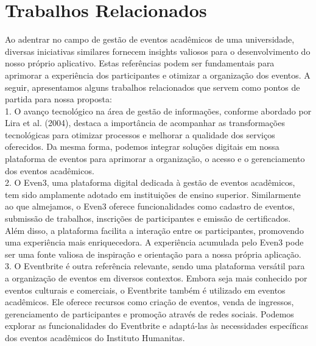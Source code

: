 \chapter{Trabalhos Relacionados}

Ao adentrar no campo de gestão de eventos acadêmicos de uma universidade, diversas iniciativas similares fornecem insights valiosos para o desenvolvimento do nosso próprio aplicativo. Estas referências podem ser fundamentais para aprimorar a experiência dos participantes e otimizar a organização dos eventos. A seguir, apresentamos alguns trabalhos relacionados que servem como pontos de partida para nossa proposta: \\

    1. O avanço tecnológico na área de gestão de informações, conforme abordado por Lira et al. (2004), destaca a importância de acompanhar as transformações tecnológicas para otimizar processos e melhorar a qualidade dos serviços oferecidos. Da mesma forma, podemos integrar soluções digitais em nossa plataforma de eventos para aprimorar a organização, o acesso e o gerenciamento dos eventos acadêmicos. \\
    
    2. O Even3, uma plataforma digital dedicada à gestão de eventos acadêmicos, tem sido amplamente adotado em instituições de ensino superior. Similarmente ao que almejamos, o Even3 oferece funcionalidades como cadastro de eventos, submissão de trabalhos, inscrições de participantes e emissão de certificados. Além disso, a plataforma facilita a interação entre os participantes, promovendo uma experiência mais enriquecedora. A experiência acumulada pelo Even3 pode ser uma fonte valiosa de inspiração e orientação para a nossa própria aplicação. \\
    
    3. O Eventbrite é outra referência relevante, sendo uma plataforma versátil para a organização de eventos em diversos contextos. Embora seja mais conhecido por eventos culturais e comerciais, o Eventbrite também é utilizado em eventos acadêmicos. Ele oferece recursos como criação de eventos, venda de ingressos, gerenciamento de participantes e promoção através de redes sociais. Podemos explorar as funcionalidades do Eventbrite e adaptá-las às necessidades específicas dos eventos acadêmicos do Instituto Humanitas.

    